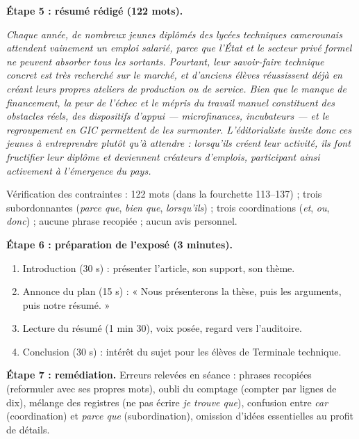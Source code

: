 \documentclass[11pt]{article}
\newcounter{popsec}
\newcounter{popsub}
\newcommand{\courssub}[1]{%
  \stepcounter{popsub}%
  \par\vspace{9pt}\noindent{\popxbold\fontsize{11.5}{13}\selectfont\color{popink}{\color{poporange}\thepopsec.\thepopsub}\hspace{6pt}#1}\par\nopagebreak\vspace{4pt}
}
\begin{document}
\begin{exoresolu}
\textbf{Étape 5 : résumé rédigé (122 mots).}

\emph{Chaque année, de nombreux jeunes diplômés des lycées techniques camerounais attendent vainement un emploi salarié, parce que l'État et le secteur privé formel ne peuvent absorber tous les sortants. Pourtant, leur savoir-faire technique concret est très recherché sur le marché, et d'anciens élèves réussissent déjà en créant leurs propres ateliers de production ou de service. Bien que le manque de financement, la peur de l'échec et le mépris du travail manuel constituent des obstacles réels, des dispositifs d'appui — microfinances, incubateurs — et le regroupement en GIC permettent de les surmonter. L'éditorialiste invite donc ces jeunes à entreprendre plutôt qu'à attendre : lorsqu'ils créent leur activité, ils font fructifier leur diplôme et deviennent créateurs d'emplois, participant ainsi activement à l'émergence du pays.}

Vérification des contraintes : 122 mots (dans la fourchette 113--137) ; trois subordonnantes (\emph{parce que}, \emph{bien que}, \emph{lorsqu'ils}) ; trois coordinations (\emph{et}, \emph{ou}, \emph{donc}) ; aucune phrase recopiée ; aucun avis personnel.

\textbf{Étape 6 : préparation de l'exposé (3 minutes).}

\begin{enumerate}
\item Introduction (30 s) : présenter l'article, son support, son thème.
\item Annonce du plan (15 s) : « Nous présenterons la thèse, puis les arguments, puis notre résumé. »
\item Lecture du résumé (1 min 30), voix posée, regard vers l'auditoire.
\item Conclusion (30 s) : intérêt du sujet pour les élèves de Terminale technique.
\end{enumerate}

\textbf{Étape 7 : remédiation.} Erreurs relevées en séance : phrases recopiées (reformuler avec ses propres mots), oubli du comptage (compter par lignes de dix), mélange des registres (ne pas écrire \emph{je trouve que}), confusion entre \emph{car} (coordination) et \emph{parce que} (subordination), omission d'idées essentielles au profit de détails.

\end{exoresolu}

\courssub{Bilan de l'activité}
\end{document}
